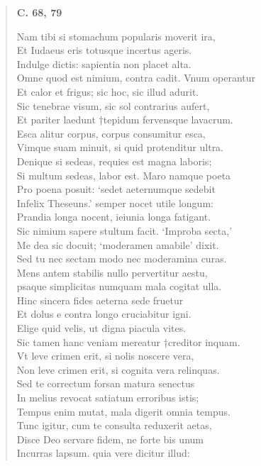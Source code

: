 \documentclass[11pt, a4paper]{report}
\begin{document}
\begin{verse}
     \marginpar{[165]} \begin{center} \textbf{C. 68, 79} \end{center}Nam tibi si stomachum popularis moverit ira, \\ Et Iudaeus eris totusque incertus ageris. \\ Indulge dictis: sapientia non placet alta. \\ Omne quod est nimium, contra cadit. Vnum operantur \\ Et calor et frigus; sic hoc, sic illud adurit. \\ Sic tenebrae visum, sic sol contrarius aufert, \\ Et pariter laedunt †tepidum fervensque lavacrum. \\ Esca alitur corpus, corpus consumitur esca, \\ Vimque suam minuit, si quid protenditur ultra. \\ Denique si sedeas, requies est magna laboris; \\ Si multum sedeas, labor est. Maro namque poeta \\ Pro poena posuit: ‘sedet aeternumque sedebit \\ Infelix Theseuns.’ semper nocet utile longum: \\ Prandia longa nocent, ieiunia longa fatigant. \\ Sic nimium sapere stultum facit. ‘Improba secta,’ \\ Me dea sic docuit; ‘moderamen amabile’ dixit. \\ Sed tu nec sectam modo nec moderamina curas. \\ Mens antem stabilis nullo pervertitur aestu, \\ psaque simplicitas numquam mala cogitat ulla. \\ Hinc sincera fides aeterna sede fruetur \\ Et dolus e contra longo cruciabitur igni. \\ Elige quid velis, ut digna piacula vites. \\ Sic tamen hanc veniam mereatur †creditor inquam. \\ Vt leve crimen erit, si nolis noscere vera, \\ Non leve crimen erit, si cognita vera relinquas. \\ Sed te correctum forsan matura senectus \\ In melius revocat satiatum erroribus istis; \\ Tempus enim mutat, mala digerit omnia tempus. \\ Tunc igitur, cum te consulta reduxerit aetas, \\ Disce Deo servare fidem, ne forte bis unum \\ Incurras lapsum. quia vere dicitur illud: \\ 

\end{verse}
\end{document}
